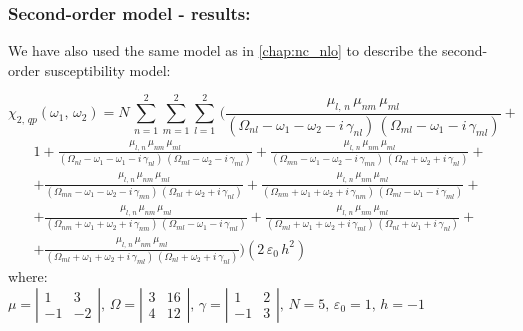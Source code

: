 \documentclass[12pt,twoside,a4paper]{article}
\numberwithin{equation}{subsection}
\numberwithin{figure}{subsection}
\begin{document}
\subsubsection*{Second-order model - results:}

We have also used the same model as in \ref{chap:nc_nlo} to describe the second-order susceptibility model:

\begin{equation} \label{eq:fht_qp2}
  \chi_{2, \,qp}({\omega_{1}}, \,{\omega_{2}})=N\,\sum_{n=1}^{2}\sum_{m=1}^{2}\sum_{l=1}^{2}\,
    (\frac {{\mu_{l,\,n}}\,{\mu_{nm}}\,{\mu_{ml}}}
      {({\Omega_{nl}} - \omega_1 - \omega_2 - i\,{\gamma_{nl}})\,({\Omega_{ml}} - \omega_1 - i\,{\gamma_{ml}})} +
\end{equation}
\begin{alignat*}{1}
  + \frac   {{\mu_{l, \,n}}\,{\mu_{nm}}\,{\mu_{ml}}}
      {({\Omega_{nl}} - \omega_1 - \omega_1 - i\,{\gamma_{nl}})\,({\Omega_{ml}} - \omega_2 - i\,{\gamma_{ml}})}
      \nonumber 
  + \frac   {{\mu_{l, \,n}}\,{\mu_{nm}}\,{\mu_{ml}}}
      {({\Omega_{mn}} - \omega_1 - \omega_2 - i\,{\gamma_{mn}})\,({\Omega_{nl}} + \omega_2 + i\,{\gamma_{nl}})}
      \nonumber 
+\\ + \frac{{\mu_{l, \,n }}\,{\mu_{nm}}\,{\mu_{ml}}} 
      {({\Omega_{mn}} - \omega_1 - \omega_2 - i\,{\gamma_{mn}})\,({\Omega_{nl}} + \omega_2 + i\,{\gamma_{nl}})} 
  + \frac   {{\mu_{l, \,n}}\,{\mu_{nm}}\,{\mu_{ml}}}
      {({\Omega_{nm}} + \omega_1 + \omega_2 + i\,{\gamma_{nm}})\,({\Omega_{ml}} - \omega_1 - i\,{\gamma_{ml}})}
      \nonumber
+\\ + \frac {{\mu_{l, \,n}}\,{\mu_{ nm}}\,{\mu_{ml}}}
      {({\Omega_{nm}} + \omega_1 + \omega_2 + i\,{\gamma_{nm}})\,({\Omega_{ml}} - \omega_1 - i\,{\gamma_{ml}})} 
  + \frac {{\mu_{l, \,n}}\,{\mu_{nm}}\,{\mu_{ml}}}
      {({\Omega_{ml}} + \omega_1 + \omega_2 + i\,{\gamma_{ml}})\,({\Omega_{nl}} + \omega_1 + i\,{\gamma_{nl}})}
      \nonumber 
+\\ + \frac {{\mu_{l, \,n}}\,{\mu_{nm}}\,{\mu_{ml}}}
      {({\Omega_{ml}} + \omega_1 + \omega_2 + i\,{\gamma_{ml}})\,({\Omega_{nl}} + \omega_2 + i\,{\gamma_{nl}})})  
      (2\,{\varepsilon_{0}}\,h^{2})
\end{alignat*}
where: \\
$\mu = \left| \begin{array}{cc} 
    1 & 3 \\ -1 & -2 
  \end{array} \right|,\, 
  \Omega = \left| \begin{array}{cc} 
    3 & 16 \\ 4 & 12 
  \end{array} \right|,\,
  \gamma = \left| \begin{array}{cc} 
  1 & 2 \\ -1 & 3
  \end{array} \right|,\, N=5,\, {\varepsilon_{0}}=1,\,h= - 1$
\end{document}
